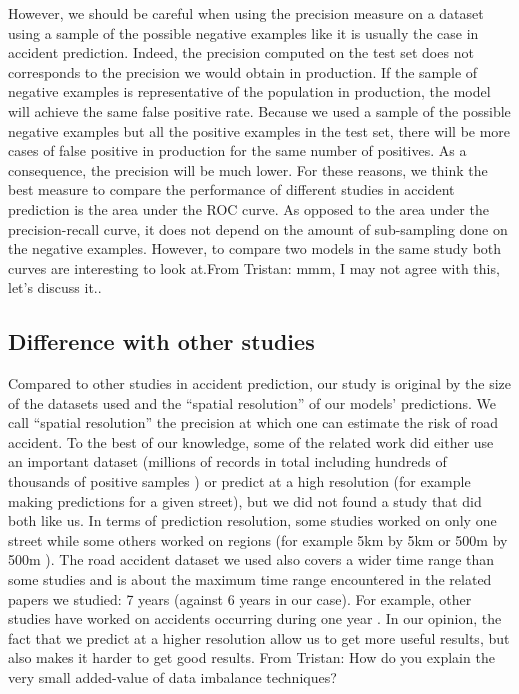 \documentclass[conference]{IEEEtran}
\newcommand{\TG}[1]{\colorlet{saved}{.}\color{orange}From Tristan: #1\color{saved}}
\begin{document}
However, we should be careful when using the precision measure on a dataset using a sample of the possible negative examples like it is usually the case in accident prediction. Indeed, the precision computed on the test set does not corresponds to the precision we would obtain in production.
If the sample of negative examples is representative of the population
in production, the model will achieve the same false positive rate.
Because we used a sample of the possible negative examples but all the 
positive examples in the test set, there will be more cases of false positive in production for the same number of positives. As a consequence, the precision will be much lower.
For these reasons, we think the best measure to compare the performance of
different studies in accident prediction is the area under the ROC curve.
As opposed to the area under the precision-recall curve, it does not depend on the amount of sub-sampling done on the negative examples. However, to compare two models in the same study both curves are interesting to look at.\TG{mmm, I may not agree with this, let's discuss it.}. 

\subsection{Difference with other studies}
Compared to other studies in accident prediction, our study is original by the size of the datasets used and the ``spatial resolution'' of our models' predictions. We call ``spatial resolution'' the precision at which one can estimate the risk of road accident. To the best of our knowledge, some of the related work did either use an important dataset (millions of records in total including hundreds of thousands of positive samples \cite{QChen2016}) or predict at a high resolution (for example making predictions for a given street), but we did not found a study that did both like us. In terms of prediction resolution, some studies worked on only one street \cite{Chang2005} \cite{Chang2005b} \cite{Lin2015} while some others worked on regions (for example 5km by 5km \cite{QChen2016} or 500m by 500m \cite{Yuan2018}). The road accident dataset we used also covers a wider time range than some studies and is about the maximum time range encountered in the related papers we studied: 7 years \cite{Yuan2018} (against 6 years in our case). For example, other studies have worked on accidents occurring during one year \cite{Chang2005} \cite{Chang2005b} \cite{QChen2016} \cite{Lin2015}. In our opinion, the fact that we predict at a higher resolution allow us to get more useful results, but also makes it harder to get good results.
\TG{How do you explain the very small added-value of data imbalance techniques?}
\end{document}
